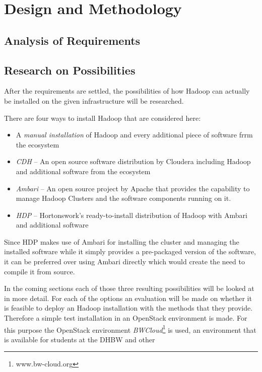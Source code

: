 \chapter{Design and Methodology}
\label{chap:design}

\section{Analysis of Requirements}

\section{Research on Possibilities}

After the requirements are settled,
the possibilities of how Hadoop can actually be installed 
on the given infrastructure will be researched.

There are four ways to install Hadoop that are considered here:

\begin{itemize}
    \item A \emph{manual installation} of Hadoop 
        and every additional piece of software frrm the ecosystem
    \item \emph{\ac{CDH}} --  An open source software distribution by Cloudera including Hadoop
        and additional software from the ecosystem
    \item \emph{Ambari} -- An open source project by Apache that provides
        the capability to manage Hadoop Clusters and the software components running on it.
    \item \emph{\ac{HDP}} -- Hortonswork's ready-to-install distribution of Hadoop 
        with Ambari and additional software
\end{itemize}

Since \ac{HDP} makes use of Ambari for installing the cluster and managing the installed software while it simply provides a pre-packaged version of the software, 
it can be preferred over using Ambari directly which would create the need to compile it from source.

In the coming sections each of those three resulting possibilities will be looked at in more detail.
For each of the options an evaluation will be made on whether it is 
feasible to deploy an Hadoop installation with the methods that they provide.
Therefore a simple test installation in an OpenStack environment is made.
For this purpose the OpenStack environment \emph{BWCloud}\footnote{www.bw-cloud.org} is used, an environment that is available for students at the \ac{DHBW} and other 


